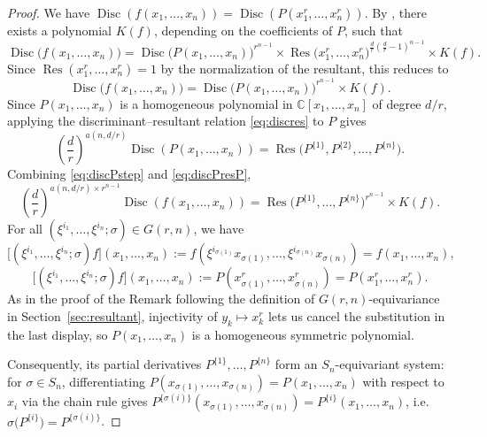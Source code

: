 \documentclass[12pt]{amsart}
\theoremstyle{definition}
\newcommand{\Res}{\operatorname{Res}}
\newcommand{\Disc}{\operatorname{Disc}}
\begin{document}
\begin{proof}
We have $\Disc(f(x_1,\dots,x_n)) = \Disc(P(x_1^r,\dots,x_n^r))$. By \citep[Proposition 4.15]{BuseJouanolou2014}, there exists a polynomial $K(f)$, depending on the coefficients of $P$, such that
\[
\Disc\big(f(x_1,\dots,x_n)\big) = \Disc\big(P(x_1,\dots,x_n)\big)^{r^{n-1}} \times \Res\big(x_1^r,\dots,x_n^r\big)^{\frac{d}{r}\left(\frac{d}{r}-1\right)^{n-1}} \times K(f).
\]
Since $\Res(x_1^r,\dots,x_n^r) = 1$ by the normalization of the resultant, this reduces to
\begin{equation}
\label{eq:discPstep}
\Disc\big(f(x_1,\dots,x_n)\big) = \Disc\big(P(x_1,\dots,x_n)\big)^{r^{n-1}} \times K(f).
\end{equation}
Since $P(x_1,\dots,x_n)$ is a homogeneous polynomial in $\mathbb{C}[x_1,\dots,x_n]$ of degree $d/r$, applying the discriminant--resultant relation \eqref{eq:discres} to $P$ gives
\begin{equation}
\label{eq:discPresP}
\left(\frac{d}{r}\right)^{a(n,d/r)}\Disc(P(x_1,\dots,x_n)) = \Res\big(P^{\{1\}},P^{\{2\}},\dots,P^{\{n\}}\big).
\end{equation}
Combining \eqref{eq:discPstep} and \eqref{eq:discPresP},
\begin{equation}
\label{eq:combined}
\left(\frac{d}{r}\right)^{a(n,d/r)\times r^{n-1}}\Disc(f(x_1,\dots,x_n)) = \Res\big(P^{\{1\}},\dots,P^{\{n\}}\big)^{r^{n-1}} \times K(f).
\end{equation}
For all $(\xi^{i_1},\dots,\xi^{i_n};\sigma) \in G(r,n)$, we have
\[
\big[(\xi^{i_1},\dots,\xi^{i_n};\sigma)f\big](x_1,\dots,x_n) := f(\xi^{i_{\sigma(1)}}x_{\sigma(1)},\dots,\xi^{i_{\sigma(n)}}x_{\sigma(n)}) = f(x_1,\dots,x_n),
\]
\[
\big[(\xi^{i_1},\dots,\xi^{i_n};\sigma)f\big](x_1,\dots,x_n) := P(x_{\sigma(1)}^r,\dots,x_{\sigma(n)}^r) = P(x_1^r,\dots,x_n^r).
\]
As in the proof of the Remark following the definition of $G(r,n)$-equivariance in Section~\ref{sec:resultant}, injectivity of $y_k \mapsto x_k^r$ lets us cancel the substitution in the last display, so $P(x_1,\dots,x_n)$ is a homogeneous symmetric polynomial.

Consequently, its partial derivatives $P^{\{1\}},\dots,P^{\{n\}}$ form an $S_n$-equivariant system: for $\sigma \in S_n$, differentiating $P(x_{\sigma(1)},\dots,x_{\sigma(n)}) = P(x_1,\dots,x_n)$ with respect to $x_i$ via the chain rule gives $P^{\{\sigma(i)\}}(x_{\sigma(1)},\dots,x_{\sigma(n)}) = P^{\{i\}}(x_1,\dots,x_n)$, i.e.\ $\sigma\big(P^{\{i\}}\big) = P^{\{\sigma(i)\}}$.


\end{proof}
\end{document}
